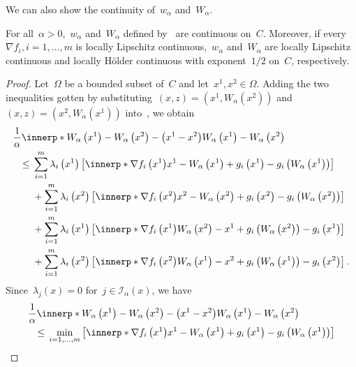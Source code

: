 \documentclass[../../main]{subfiles}
\begin{document}
We can also show the continuity of~$w_\alpha$ and~$W_\alpha$.
\begin{theorem} 
    For all~$\alpha > 0$,~$w_\alpha$ and~$W_\alpha$ defined by~ are continuous on~$C$.
    Moreover, if every~$\nabla f_i, i = 1, \dots, m$ is locally Lipschitz continuous,~$w_\alpha$ and~$W_\alpha$ are locally Lipschitz continuous and locally H\"older continuous with exponent~$1 / 2$ on~$C$, respectively.
\end{theorem}
\begin{proof}
    Let~$\Omega$ be a bounded subset of~$C$ and let~$x^1, x^2 \in \Omega$.
    Adding the two inequalities gotten by substituting~$(x, z) = (x^1, W_\alpha\left(x^2\right))$ and~$(x, z) = (x^2, W_\alpha\left(x^1\right))$ into~, we obtain
    \begin{align}
        \MoveEqLeft \frac{1}{\alpha} \innerp*{W_\alpha\left(x^1\right) - W_\alpha\left(x^2\right) - \left(x^1 - x^2\right)}{W_\alpha\left(x^1\right) - W_\alpha\left(x^2\right)} \\
        \le{}& \sum_{i = 1}^{m} \lambda_i\left(x^1\right)\left[ \innerp*{\nabla f_i\left(x^1\right)}{x^1 - W_\alpha\left(x^1\right)} + g_i\left(x^1\right) - g_i\left(W_\alpha\left(x^1\right)\right) \right] \\
             &+ \sum_{i = 1}^{m} \lambda_i\left(x^2\right) \left[ \innerp*{\nabla f_i\left(x^2\right)}{x^2 - W_\alpha\left(x^2\right)} + g_i\left(x^2\right) - g_i\left(W_\alpha\left(x^2\right)\right) \right] \\
             &+ \sum_{i = 1}^{m} \lambda_i\left(x^1\right) \left[ \innerp*{\nabla f_i\left(x^1\right)}{W_\alpha\left(x^2\right) - x^1} + g_i\left(W_\alpha\left(x^2\right)\right) - g_i\left(x^1\right) \right] \\
             &+ \sum_{i = 1}^{m} \lambda_i\left(x^2\right) \left[ \innerp*{\nabla f_i\left(x^2\right)}{W_\alpha\left(x^1\right) - x^2} + g_i\left(W_\alpha\left(x^1\right)\right) - g_i\left(x^2\right) \right]
         .\end{align}
         Since~$\lambda_j(x) = 0$ for~$j \in \mathcal{I}_\alpha(x)$, we have
         \begin{align}
             \MoveEqLeft \frac{1}{\alpha} \innerp*{W_\alpha\left(x^1\right) - W_\alpha\left(x^2\right) - \left(x^1 - x^2\right)}{W_\alpha\left(x^1\right) - W_\alpha\left(x^2\right)} \\
             \le{}& \min_{i = 1, \dots, m} \left[ \innerp*{\nabla f_i\left(x^1\right)}{x^1 - W_\alpha\left(x^1\right)} + g_i\left(x^1\right) - g_i\left(W_\alpha\left(x^1\right)\right) \right] \\

\end{align}
\end{proof}
\end{document}
